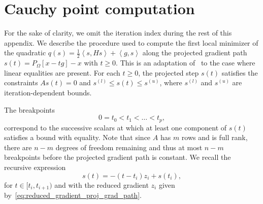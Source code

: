 \documentclass{article}
\numberwithin{equation}{section}
\newcommand{\inner}[2]{\left\langle {#1} , {#2} \right\rangle} %
\newcommand{\proj}[2]{P_{#1} \left[ {#2} \right]} %
\theoremstyle{plain}
\begin{document}
				\section{Cauchy point computation}\label{appendix:cauchy_point_computation}
				
				For the sake of clarity, we omit the iteration index during the rest of this appendix. 
				We describe the procedure used to compute the first local minimizer of the quadratic $q(s) = \frac{1}{2} \inner{s}{Hs} + \inner{g}{s}$ along the projected gradient path $s(t) = \proj{\Omega}{x-tg}-x$ with $t \ge 0$. This is an adaptation of~\cite[Algorithm 17.3.1]{conn-etal:2000} to the case where linear equalities are present. 
				For each $t \ge 0$, the projected step $s(t)$ satisfies the constraints
				$As(t) = 0$ and $s^{(l)} \le s(t) \le s^{(u)}$,
				where $s^{(l)}$ and $s^{(u)}$ are iteration-dependent bounds.
				
				The breakpoints
				\begin{equation*}
					0=t_0 < t_1 < \ldots < t_p,
				\end{equation*} 
				correspond to the successive scalars at which at least one component of $s(t)$ satisfies a bound with equality. Note that since $A$ has $m$ rows and is full rank, there are $n-m$ degrees of freedom remaining  and thus at most $n-m$ breakpoints before the projected gradient path is constant. We recall the recursive expression
				\[s(t) = -(t-t_i)z_i + s(t_i),\]
				for $t\in [t_i,t_{i+1})$ and with the reduced gradient $z_i$ given by~\eqref{eq:reduced_gradient_proj_grad_path}.
				
\end{document}
